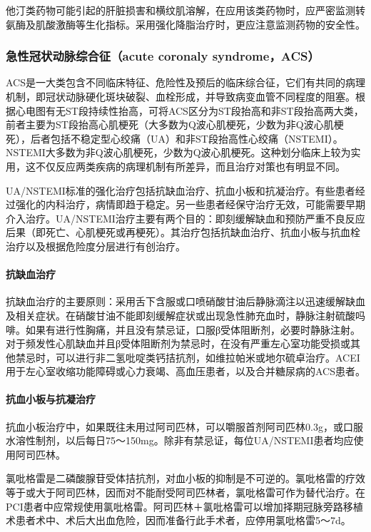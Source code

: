 他汀类药物可能引起的肝脏损害和横纹肌溶解，在应用该类药物时，应严密监测转氨酶及肌酸激酶等生化指标。采用强化降脂治疗时，更应注意监测药物的安全性。

\subsubsection{急性冠状动脉综合征（acute coronaly syndrome，ACS）}

ACS是一大类包含不同临床特征、危险性及预后的临床综合征，它们有共同的病理机制，即冠状动脉硬化斑块破裂、血栓形成，并导致病变血管不同程度的阻塞。根据心电图有无ST段持续性抬高，可将ACS区分为ST段抬高和非ST段抬高两大类，前者主要为ST段抬高心肌梗死（大多数为Q波心肌梗死，少数为非Q波心肌梗死），后者包括不稳定型心绞痛（UA）和非ST段抬高性心绞痛（NSTEMI）。NSTEMI大多数为非Q波心肌梗死，少数为Q波心肌梗死。这种划分临床上较为实用，这不仅反应两类疾病的病理机制有所差异，而且治疗对策也有明显不同。

UA/NSTEMI标准的强化治疗包括抗缺血治疗、抗血小板和抗凝治疗。有些患者经过强化的内科治疗，病情即趋于稳定。另一些患者经保守治疗无效，可能需要早期介入治疗。UA/NSTEMI治疗主要有两个目的：即刻缓解缺血和预防严重不良反应后果（即死亡、心肌梗死或再梗死）。其治疗包括抗缺血治疗、抗血小板与抗血栓治疗以及根据危险度分层进行有创治疗。
\paragraph{抗缺血治疗}

抗缺血治疗的主要原则：采用舌下含服或口喷硝酸甘油后静脉滴注以迅速缓解缺血及相关症状。在硝酸甘油不能即刻缓解症状或出现急性肺充血时，静脉注射硫酸吗啡。如果有进行性胸痛，并且没有禁忌证，口服β受体阻断剂，必要时静脉注射。对于频发性心肌缺血并且β受体阻断剂为禁忌时，在没有严重左心室功能受损或其他禁忌时，可以进行非二氢吡啶类钙拮抗剂，如维拉帕米或地尔硫卓治疗。ACEI用于左心室收缩功能障碍或心力衰竭、高血压患者，以及合并糖尿病的ACS患者。
\paragraph{抗血小板与抗凝治疗}

抗血小板治疗中，如果既往未用过阿司匹林，可以嚼服首剂阿司匹林0.3g，或口服水溶性制剂，以后每日75～150mg。除非有禁忌证，每位UA/NSTEMI患者均应使用阿司匹林。

氯吡格雷是二磷酸腺苷受体拮抗剂，对血小板的抑制是不可逆的。氯吡格雷的疗效等于或大于阿司匹林，因而对不能耐受阿司匹林者，氯吡格雷可作为替代治疗。在PCI患者中应常规使用氯吡格雷。阿司匹林＋氯吡格雷可以增加择期冠脉旁路移植术患者术中、术后大出血危险，因而准备行此手术者，应停用氯吡格雷5～7d。

